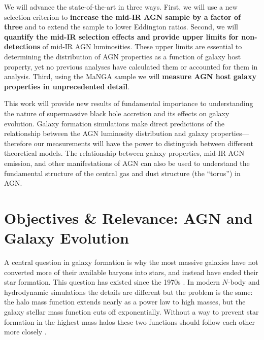 \documentclass[12pt, preprint]{hacked-aastex}
\begin{document}
We will advance the state-of-the-art in three ways. First, we will use
a new selection criterion to {\bf increase the mid-IR AGN sample by a
  factor of three} and to extend the sample to lower Eddington
ratios. Second, we will {\bf quantify the mid-IR selection effects and
  provide upper limits for non-detections} of mid-IR AGN
luminosities. These upper limits are essential to determining the
distribution of AGN properties as a function of galaxy host property,
yet no previous analyses have calculated them or accounted for them in
analysis.  Third, using the MaNGA sample we will {\bf measure AGN host
  galaxy properties in unprecedented detail}.

This work will provide new results of fundamental importance to
understanding the nature of supermassive black hole accretion and its
effects on galaxy evolution.  Galaxy formation simulations make direct
predictions of the relationship between the AGN luminosity
distribution and galaxy properties---therefore our measurements will
have the power to distinguish between different theoretical
models. The relationship between galaxy properties, mid-IR AGN
emission, and other manifestations of AGN can also be used to
understand the fundamental structure of the central gas and dust
structure (the ``torus'') in AGN.

\section{Objectives \& Relevance: AGN and Galaxy Evolution}\label{sec:objectives}


A central question in galaxy formation is why the most massive
galaxies have not converted more of their available baryons into
stars, and instead have ended their star formation. This question has
existed since the 1970s \cite{white78a}.  In modern $N$-body and
hydrodynamic simulations the details are different but the problem is
the same: the halo mass function extends nearly as a power law to high
masses, but the galaxy stellar mass function cuts off exponentially.
Without a way to prevent star formation in the highest mass halos
these two functions should follow each other more closely
\cite{benson03a, somerville15a}.
\end{document}
